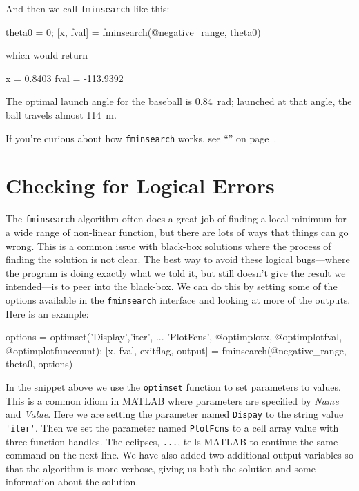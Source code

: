 And then we call \lstinline{fminsearch} like this:

\begin{code}
    theta0 = 0;
    [x, fval] = fminsearch(@negative_range, theta0)
\end{code}
which would return
\begin{code}
    x =
    0.8403
fval =
 -113.9392
\end{code}

The optimal launch angle for the baseball is \SI{0.84}{\radian}; launched at that angle, the ball travels almost \SI{114}{\meter}.

If you're curious about how \lstinline{fminsearch} works, see ``'' on page~\pageref{howfminsearch}.

\section{Checking for Logical Errors}

The \lstinline{fminsearch} algorithm often does a great job of finding a local minimum for a wide range of non-linear function, but there are lots of ways that things can go wrong.  This is a common issue with black-box solutions where the process of finding the solution is not clear.   The best way to avoid these logical bugs---where the program is doing exactly what we told it, but still doesn't give the result we intended---is to peer into the black-box. We can do this by setting some of the options available in the \lstinline{fminsearch} interface and looking at more of the outputs.  Here is an example:

\begin{code}
    options = optimset('Display','iter', ...
        'PlotFcns', {@optimplotx, @optimplotfval, @optimplotfunccount});
    [x, fval, exitflag, output] = fminsearch(@negative_range, theta0, options)
\end{code}

In the snippet above we use the \href{https://www.mathworks.com/help/matlab/ref/optimset.html}{\lstinline{optimset}} function to set parameters to values.  This is a common idiom in MATLAB where parameters are specified by \emph{Name} and \emph{Value}.  Here we are setting the parameter named \lstinline{Dispay} to the string value \lstinline{'iter'}.  Then we set the parameter named \lstinline{PlotFcns} to a cell array value with three function handles.  The eclipses, \lstinline{...}, tells MATLAB to continue the same command on the next line.  We have also added two additional output variables so that the algorithm is more verbose, giving us both the solution and some information about the solution.

